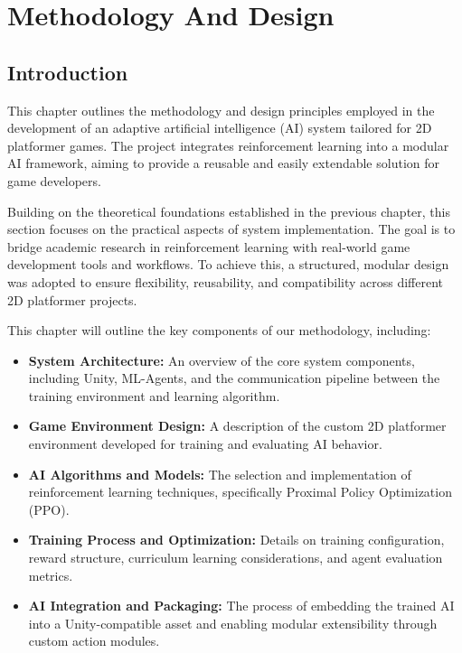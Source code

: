 \documentclass[12pt,oneside,openright,a4paper]{cpe-english-project}
\begin{document}
\chapter{Methodology And Design}

\section{Introduction}

This chapter outlines the methodology and design principles employed in the development of an adaptive artificial intelligence (AI) system tailored for 2D platformer games. The project integrates reinforcement learning into a modular AI framework, aiming to provide a reusable and easily extendable solution for game developers.\par

Building on the theoretical foundations established in the previous chapter, this section focuses on the practical aspects of system implementation. The goal is to bridge academic research in reinforcement learning with real-world game development tools and workflows. To achieve this, a structured, modular design was adopted to ensure flexibility, reusability, and compatibility across different 2D platformer projects.\par

This chapter will outline the key components of our methodology, including:
\begin{itemize}
\item \textbf{System Architecture:} An overview of the core system components, including Unity, ML-Agents, and the communication pipeline between the training environment and learning algorithm.
\item \textbf{Game Environment Design:} A description of the custom 2D platformer environment developed for training and evaluating AI behavior.
\item \textbf{AI Algorithms and Models:} The selection and implementation of reinforcement learning techniques, specifically Proximal Policy Optimization (PPO).
\item \textbf{Training Process and Optimization:} Details on training configuration, reward structure, curriculum learning considerations, and agent evaluation metrics.
\item \textbf{AI Integration and Packaging:} The process of embedding the trained AI into a Unity-compatible asset and enabling modular extensibility through custom action modules.
\end{itemize}
\end{document}
